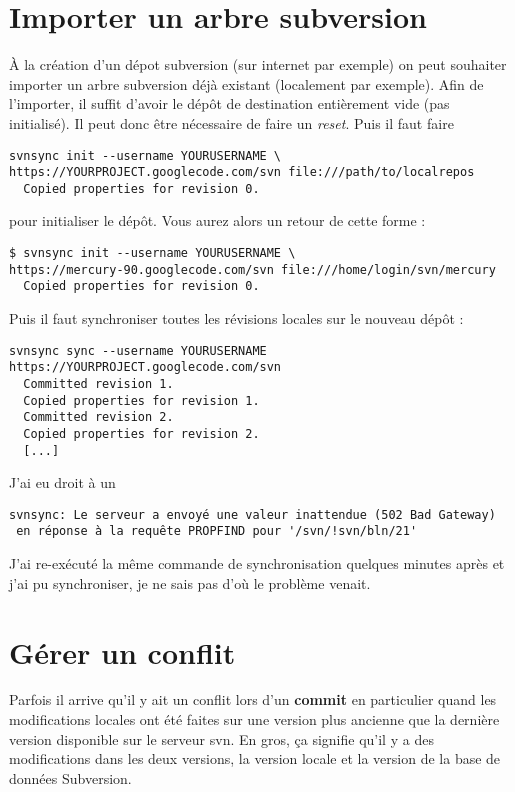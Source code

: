 \documentclass[a4paper,twoside]{article}
\begin{document}
\section{Importer un arbre subversion}
À la création d'un dépot subversion (sur internet par exemple) on peut souhaiter importer un arbre subversion déjà existant (localement par exemple). Afin de l'importer, il suffit d'avoir le dépôt de destination entièrement vide (pas initialisé). Il peut donc être nécessaire de faire un \emph{reset}. Puis il faut faire 
\begin{verbatim}
svnsync init --username YOURUSERNAME \
https://YOURPROJECT.googlecode.com/svn file:///path/to/localrepos
  Copied properties for revision 0.
\end{verbatim}
pour initialiser le dépôt. Vous aurez alors un retour de cette forme : 
\begin{verbatim}
$ svnsync init --username YOURUSERNAME \
https://mercury-90.googlecode.com/svn file:///home/login/svn/mercury
  Copied properties for revision 0.
\end{verbatim}

Puis il faut synchroniser toutes les révisions locales sur le nouveau dépôt : 
\begin{verbatim}
svnsync sync --username YOURUSERNAME https://YOURPROJECT.googlecode.com/svn
  Committed revision 1.
  Copied properties for revision 1.
  Committed revision 2.
  Copied properties for revision 2.
  [...]
\end{verbatim}

\begin{remarque}
J'ai eu droit à un 
\begin{verbatim}
svnsync: Le serveur a envoyé une valeur inattendue (502 Bad Gateway)
 en réponse à la requête PROPFIND pour '/svn/!svn/bln/21'
\end{verbatim}
J'ai re-exécuté la même commande de synchronisation quelques minutes après et j'ai pu synchroniser, je ne sais pas d'où le problème venait.
\end{remarque}

\section{Gérer un conflit}
Parfois il arrive qu'il y ait un conflit lors d'un \textbf{commit} en particulier quand les modifications locales ont été faites sur une version plus ancienne que la dernière version disponible sur le serveur svn. En gros, ça signifie qu'il y a des modifications dans les deux versions, la version locale et la version de la base de données Subversion.
\end{document}
